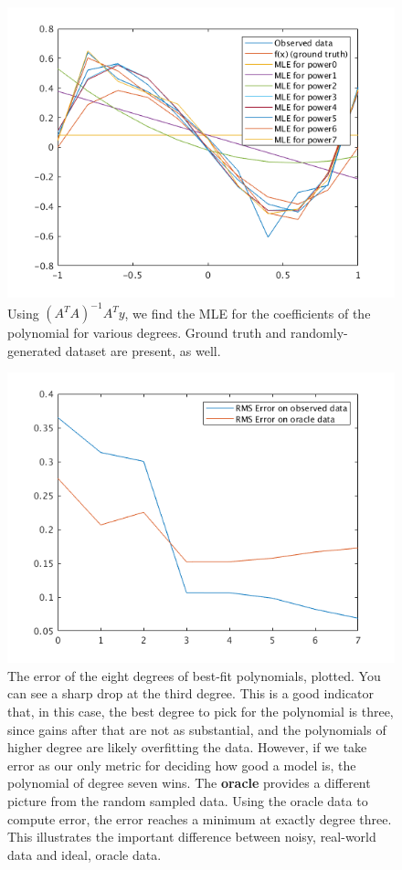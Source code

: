 \documentclass{article}
\begin{document}
\begin{figure}[!ht]
	\centering
	\includegraphics[width=120mm]{q4-mle.png}
	\caption{Using $ (A^T A)^{-1} A^T y $, we find the MLE for the coefficients 
        of the polynomial for various degrees. Ground truth and randomly-generated 
        dataset are present, as well.}
\end{figure}

\begin{figure}[!ht]
	\centering
	\includegraphics[width=120mm]{q4-rms-error.png}
	\caption{The error of the eight degrees of best-fit polynomials, plotted. 
        You can see a sharp drop at the third degree. This is a good indicator 
        that, in this case, the best degree to pick for the polynomial is three, 
        since gains after that are not as substantial, and the polynomials of 
        higher degree are likely overfitting the data. However, if we take 
        error as our only metric for deciding how good a model is, the 
        polynomial of degree seven wins.
        The \textbf{oracle} provides a different picture from the random sampled 
        data. Using the oracle data to compute error, the error reaches a 
        minimum at exactly degree three. This illustrates the important 
        difference between noisy, real-world data and ideal, oracle data.}
\end{figure}
\end{document}
